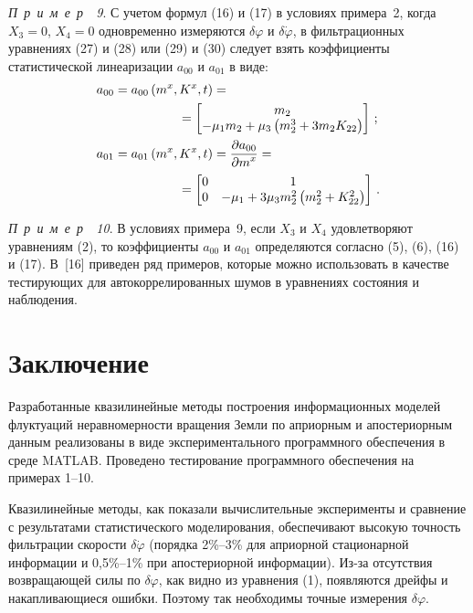 \begin{multicols}{2}
 \textit{ П\ р\ и\ м\ е\ р~~9\/}. С учетом формул (16) и (17) в условиях
примера~2, когда $X_3 =0$,
 $X_4=0$ одновременно измеряются $\delta \varphi$ и $\delta
 \dot\varphi$, в фильтрационных уравнениях (27) и (28) или (29) и (30)
 следует взять коэффициенты статистической линеаризации $a_{00}$ и
$a_{01}$ в виде:
\begin{align*}
 a_{00} &= a_{00} \left( m^x, K^x, t\right) ={}\\
 &\hspace*{50pt}{}=\begin{bmatrix}
 m_2\\
-\mu_1 m_2 +\mu_3 \left(m_2^3 + 3 m_2 K_{22}\right)\\
\end{bmatrix}\,;\\
 a_{01} &= a_{01} \left( m^x, K^x, t\right)=\fr{\partial a_{00}}{ \partial m^x} ={}\\
&\hspace*{50pt}{}=\begin{bmatrix}
 0&1\\
 0&-\mu_1 + 3\mu_3 m_2^2 \left(m_2^2+K_{22}^2\right)\\
\end{bmatrix}\,. %
\end{align*}

 \textit{ П\ р\ и\ м\ е\ р~~10\/}. В условиях примера~9, если $X_3$ и
 $X_4$ удовлетворяют уравнениям (2), то коэффициенты $a_{00}$ и
 $a_{01}$ определяются согласно (5), (6), (16) и (17). В~[16]
 приведен ряд примеров, которые можно использовать в качестве тестирующих
 для автокоррелированных шумов в уравнениях состояния и наблюдения.

\section{Заключение}  %

Разработанные квазилинейные методы построения информационных
моделей флуктуаций неравномерности вращения Земли по априорным
и апостериорным данным реализованы в виде экспериментального
программного обеспечения в среде \mbox{MATLAB}. Проведено
тестирование программного обеспечения на примерах 1--10.

Квазилинейные методы, как показали вычислительные эксперименты и
сравнение с результатами статистического моделирования, обеспечивают
высокую точность фильтрации скорости $\delta \dot\varphi$ (порядка
2\%--3\% для априорной стационарной информации и 0,5\%--1\% при
апостериорной информации). Из-за отсутствия возвращающей силы по
$\delta \varphi$, как видно из уравнения (1), появляются дрейфы и
накапливающиеся ошибки. Поэтому так необходимы точные измерения
$\delta \varphi$.


\end{multicols}
